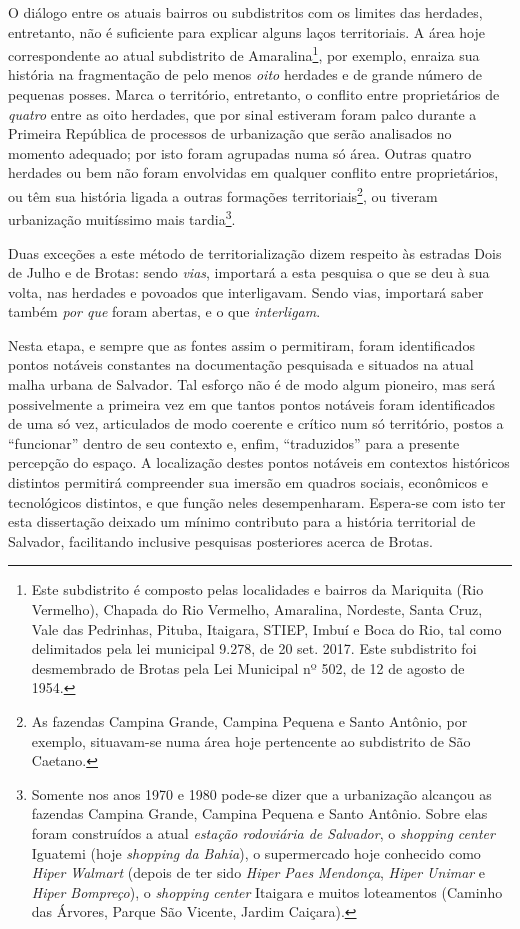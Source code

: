 O diálogo entre os atuais bairros ou subdistritos com os limites das herdades, entretanto, não é suficiente para explicar alguns laços territoriais. A área hoje correspondente ao atual subdistrito de Amaralina\footnote{Este subdistrito é composto pelas localidades e bairros da Mariquita (Rio Vermelho), Chapada do Rio Vermelho, Amaralina, Nordeste, Santa Cruz, Vale das Pedrinhas, Pituba, Itaigara, STIEP, Imbuí e Boca do Rio, tal como delimitados pela lei municipal 9.278, de 20 set. 2017. Este subdistrito foi desmembrado de Brotas pela Lei Municipal nº 502, de 12 de agosto de 1954.}, por exemplo, enraiza sua história na fragmentação de pelo menos \textit{oito} herdades e de grande número de pequenas posses. Marca o território, entretanto, o conflito entre proprietários de \textit{quatro} entre as oito herdades, que por sinal estiveram foram palco durante a Primeira República de processos de urbanização que serão analisados no momento adequado; por isto foram agrupadas numa só área. Outras quatro herdades ou bem não foram envolvidas em qualquer conflito entre proprietários, ou têm sua história ligada a outras formações territoriais\footnote{As fazendas Campina Grande, Campina Pequena e Santo Antônio, por exemplo, situavam-se numa área hoje pertencente ao subdistrito de São Caetano.}, ou tiveram urbanização muitíssimo mais tardia\footnote{Somente nos anos 1970 e 1980 pode-se dizer que a urbanização alcançou as fazendas Campina Grande, Campina Pequena e Santo Antônio. Sobre elas foram construídos a atual \textit{estação rodoviária de Salvador}, o \textit{shopping center} Iguatemi (hoje \textit{shopping da Bahia}), o supermercado hoje conhecido como \textit{Hiper Walmart} (depois de ter sido \textit{Hiper Paes Mendonça}, \textit{Hiper Unimar} e \textit{Hiper Bompreço}), o \textit{shopping center} Itaigara e muitos loteamentos (Caminho das Árvores, Parque São Vicente, Jardim Caiçara).}.

Duas exceções a este método de territorialização dizem respeito às estradas Dois de Julho e de Brotas: sendo \textit{vias}, importará a esta pesquisa o que se deu à sua volta, nas herdades e povoados que interligavam. Sendo vias, importará saber também \textit{por que} foram abertas, e o que \textit{interligam}.

Nesta etapa, e sempre que as fontes assim o permitiram, foram identificados pontos notáveis constantes na documentação pesquisada e situados na atual malha urbana de Salvador. Tal esforço não é de modo algum pioneiro, mas será possivelmente a primeira vez em que tantos pontos notáveis foram identificados de uma só vez, articulados de modo coerente e crítico num só território, postos a ``funcionar'' dentro de seu contexto e, enfim, ``traduzidos'' para a presente percepção do espaço. A localização destes pontos notáveis em contextos históricos distintos permitirá compreender sua imersão em quadros sociais, econômicos e tecnológicos distintos, e que função neles desempenharam. Espera-se com isto ter esta dissertação deixado um mínimo contributo para a história territorial de Salvador, facilitando inclusive pesquisas posteriores acerca de Brotas. 

